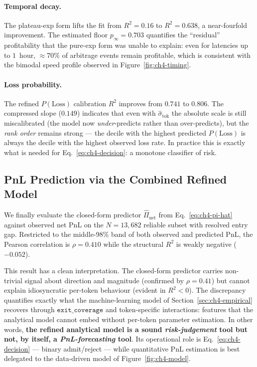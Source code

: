 \documentclass[11pt,a4paper]{article}
\begin{document}
\paragraph{Temporal decay.} The plateau-exp form lifts the fit from
$R^{2}\!=\!0.16$ to $R^{2}\!=\!0.638$, a near-fourfold improvement. The
estimated floor $p_{\infty}\!=\!0.703$ quantifies the ``residual''
profitability that the pure-exp form was unable to explain: even for
latencies up to $1$~hour, $\approx\!70\%$ of arbitrage events remain
profitable, which is consistent with the bimodal speed profile observed
in Figure~\ref{fig:ch4-timing}.

\paragraph{Loss probability.} The refined $P(\text{Loss})$ calibration
$R^{2}$ improves from $0.741$ to $\mathbf{0.806}$. The compressed slope
($0.149$) indicates that even with $\hat\sigma_{\text{tok}}$ the absolute
scale is still miscalibrated (the model now \emph{under}-predicts rather
than over-predicts), but the \emph{rank order} remains strong --- the
decile with the highest predicted $P(\text{Loss})$ is always the decile
with the highest observed loss rate. In practice this is exactly what is
needed for Eq.~\eqref{eq:ch4-decision}: a monotone classifier of risk.

\subsection{PnL Prediction via the Combined Refined Model}

We finally evaluate the closed-form predictor $\widehat{\Pi}_{\text{net}}$
from Eq.~\eqref{eq:ch4-pi-hat} against observed net PnL on the
$N=13{,}682$ reliable subset with resolved entry gap. Restricted to the
middle-98\% band of both observed and predicted PnL, the
Pearson correlation is $\rho\!=\!0.410$ while the structural
$R^{2}$ is weakly negative ($-0.052$).

This result has a clean interpretation. The closed-form predictor carries
non-trivial signal about direction and magnitude (confirmed by
$\rho\!=\!0.41$) but cannot explain idiosyncratic per-token behaviour
(evident in $R^{2}<0$). The discrepancy quantifies exactly what the
machine-learning model of Section~\ref{sec:ch4-empirical} recovers through
$\texttt{exit\_coverage}$ and token-specific interactions: features that
the analytical model cannot embed without per-token parameter estimation.
In other words, \textbf{the refined analytical model is a sound
\emph{risk-judgement} tool but not, by itself, a \emph{PnL-forecasting}
tool}. Its operational role is Eq.~\eqref{eq:ch4-decision} --- binary
admit/reject --- while quantitative PnL estimation is best delegated to
the data-driven model of Figure~\ref{fig:ch4-model}.
\end{document}
